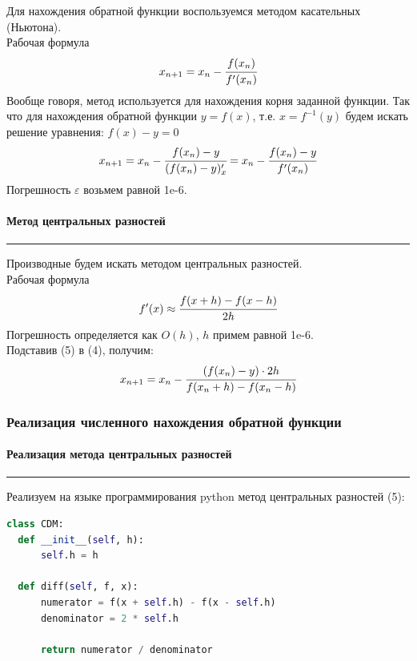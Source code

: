 \documentclass[a4paper, 14pt]{extarticle}
\begin{document}
Для нахождения обратной функции воспользуемся методом касательных (Ньютона). \\
Рабочая формула
\begin{equation*}
  x_{n+1} = x_n - \cfrac{f(x_n)}{f'(x_n)}
\end{equation*}
Вообще говоря, метод используется для нахождения корня заданной функции. Так что 
для нахождения обратной функции $y = f(x)$, т.е. $x = f^{-1}(y)$ будем искать 
решение уравнения: $f(x) - y = 0$
\begin{equation}
  x_{n+1} = x_n - \cfrac{f(x_n) - y}{(f(x_n) - y)'_x} = 
  x_n - \cfrac{f(x_n) - y}{f'(x_n)}
\end{equation}
Погрешность $\varepsilon$ возьмем равной 1e-6.

\paragraph{Метод центральных разностей}\vspace{-20pt}\rule{\linewidth}{0.1mm}

Производные будем искать методом центральных разностей.\\
Рабочая формула
\begin{equation}
  f'(x) \approx \cfrac{f(x+h) - f(x-h)}{2h}
\end{equation}
Погрешность определяется как $O(h)$, $h$ примем равной 1e-6.\\

Подставив (5) в (4), получим:
\begin{equation}
  x_{n+1} = x_n - \cfrac{(f(x_n) - y) \cdot 2 h}{f(x_n + h) - f(x_n - h)}
\end{equation}

\subsubsection{Реализация численного нахождения обратной функции}

\paragraph{Реализация метода центральных разностей}\vspace{-20pt}\rule{\linewidth}{0.1mm}

Реализуем на языке программирования python метод центральных разностей (5):

\begin{lstlisting}[language=Python, 
                   caption={Реализация метода центральных разностей}, 
                   label={lst:CDM}]
class CDM:
  def __init__(self, h):
      self.h = h
  
  def diff(self, f, x):
      numerator = f(x + self.h) - f(x - self.h)
      denominator = 2 * self.h

      return numerator / denominator
\end{lstlisting}
\end{document}
